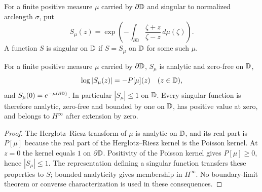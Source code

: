 \begin{definition}
  \label{def:singular_function_formula}
  \leanok
  For a finite positive measure $\mu$ carried by $\partial\mathbb{D}$ and singular
  to normalized arclength $\sigma$, put
  \[
    S_\mu(z)=\exp\left(-\int_{\partial\mathbb{D}}
      \frac{\zeta+z}{\zeta-z}\,d\mu(\zeta)\right).
  \]
  A function $S$ is singular on $\mathbb{D}$ if $S=S_\mu$ on $\mathbb{D}$ for some such $\mu$.
\end{definition}

\begin{theorem}
  \label{eq:II_5_9}
  \leanok
  For a finite positive measure $\mu$ carried by $\partial\mathbb{D}$, $S_\mu$ is
  analytic and zero-free on $\mathbb{D}$,
  \[
    \log|S_\mu(z)|=-P[\mu](z)\quad(z\in\mathbb{D}),
  \]
  and $S_\mu(0)=e^{-\mu(\partial\mathbb{D})}$. In particular $|S_\mu|\le1$ on $\mathbb{D}$.
  Every singular function is therefore analytic, zero-free and bounded by one
  on $\mathbb{D}$, has positive value at zero, and belongs to $H^\infty$ after extension
  by zero.
  \begin{proof}
    \leanok
    The Herglotz--Riesz transform of $\mu$ is analytic on $\mathbb{D}$, and its real
    part is $P[\mu]$ because the real part of the Herglotz--Riesz kernel is the
    Poisson kernel. At $z=0$ the kernel equals $1$ on $\partial\mathbb{D}$.
    Positivity of the Poisson kernel gives $P[\mu]\ge0$, hence $|S_\mu|\le1$.
    The representation defining a singular function transfers these properties
    to $S$; bounded analyticity gives membership in $H^\infty$. No boundary-limit
    theorem or converse characterization is used in these consequences.
  \end{proof}
\end{theorem}

